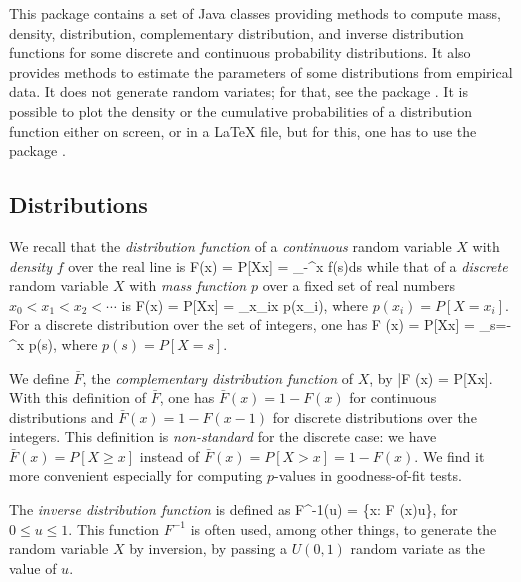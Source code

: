 
This package contains a set of Java classes providing methods to 
compute mass, density, distribution, complementary
distribution, and inverse distribution functions for some discrete
and continuous probability distributions.
It also provides methods to estimate the parameters of some distributions
from empirical data.
It does not generate random variates;
for that, see the package .
It is possible to plot the density or the cumulative probabilities of a
distribution function either on screen, or in a \LaTeX{} file, but for this, 
one has to use the package 
.



\subsection* {Distributions}

We recall that the {\em distribution function\/} of a {\em continuous\/} 
random variable $X$ with {\em density\/} $f$ over the real line is
\eq
  F(x) = P[X\le x] = \int_{-\infty}^x f(s)ds    \label{eq:FDist}
\endeq
while that of a {\em discrete\/} random variable $X$ with 
{\em mass function\/} $p$ over a fixed set of real numbers 
$x_0 < x_1 < x_2 < \cdots$ is
\eq
  F(x) = P[X\le x] = \sum_{x_i\le x} p(x_i),     \label{eq:FDistDisc}
\endeq
where $p(x_i) = P[X = x_i]$.
For a discrete distribution over the set of integers, one has
\eq
  F (x) = P[X\le x] = \sum_{s=-\infty}^x p(s),   \label{eq:FDistDiscInt}
\endeq
where $p(s) = P[X=s]$.

We define $\bar{F}$, the {\em complementary distribution function\/} 
of $X$, by 
\eq
 \bar{F} (x) = P[X\ge x].
\endeq
With this definition of $\bar{F}$, one has
$\bar{F}(x) = 1 - F (x)$ for continuous distributions and
$\bar{F}(x) = 1 - F (x-1)$ for discrete distributions over the integers.
This definition is \emph{non-standard} for the discrete case: we have 
$\bar{F} (x) = P[X\ge x]$ instead of $\bar{F} (x) = P[X > x] = 1-F(x)$.
We find it more convenient especially for computing $p$-values in 
goodness-of-fit tests.

The {\em inverse distribution function\/} is defined as 
\eq
   F^{-1}(u) = \inf \{x\in\RR : F (x)\ge u\}, \label{eq:inverseF}
\endeq
for $0\le u\le 1$.
This function $F^{-1}$ is often used, among other things, to generate
the random variable $X$ by inversion, by passing a
$U (0,1)$ random variate as the value of $u$.

